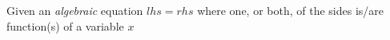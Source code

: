 \documentclass[11pt,letterpaper,twoside,titlepage]{book}
\begin{document}
					Given an \emph{algebraic} equation $ lhs = rhs $ where one, or both, of the sides is/are function(s) of a variable $x$
			
%			
%				
%				
%				
%				
%			
%				
%				
%								
%				
%				
%			
		
\end{document}
